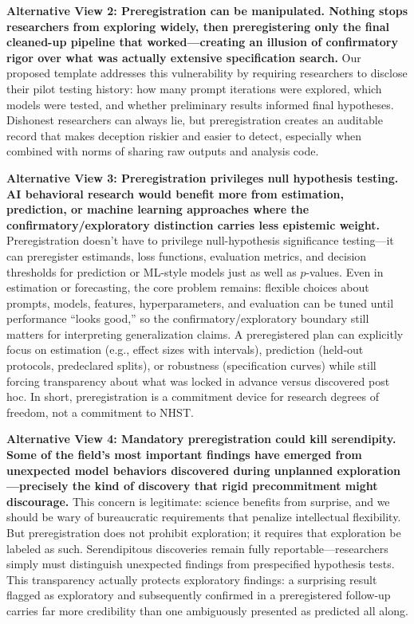 \documentclass{article}
\theoremstyle{plain}
\theoremstyle{definition}
\theoremstyle{remark}
\begin{document}
\textbf{Alternative View 2: Preregistration can be manipulated. Nothing stops researchers from exploring widely, then preregistering only the final cleaned-up pipeline that worked—creating an illusion of confirmatory rigor over what was actually extensive specification search.} Our proposed template addresses this vulnerability by requiring researchers to disclose their pilot testing history: how many prompt iterations were explored, which models were tested, and whether preliminary results informed final hypotheses. Dishonest researchers can always lie, but preregistration creates an auditable record that makes deception riskier and easier to detect, especially when combined with norms of sharing raw outputs and analysis code. 

\textbf{Alternative View 3: Preregistration privileges null hypothesis testing. AI behavioral research would benefit more from estimation, prediction, or machine learning approaches where the confirmatory/exploratory distinction carries less epistemic weight.} Preregistration doesn’t have to privilege null-hypothesis significance testing—it can preregister estimands, loss functions, evaluation metrics, and decision thresholds for prediction or ML-style models just as well as $p$-values. Even in estimation or forecasting, the core problem remains: flexible choices about prompts, models, features, hyperparameters, and evaluation can be tuned until performance “looks good,” so the confirmatory/exploratory boundary still matters for interpreting generalization claims. A preregistered plan can explicitly focus on estimation (e.g., effect sizes with intervals), prediction (held-out protocols, predeclared splits), or robustness (specification curves) while still forcing transparency about what was locked in advance versus discovered post hoc. In short, preregistration is a commitment device for research degrees of freedom, not a commitment to NHST.

\textbf{Alternative View 4: Mandatory preregistration could kill serendipity. Some of the field's most important findings have emerged from unexpected model behaviors discovered during unplanned exploration—precisely the kind of discovery that rigid precommitment might discourage.} This concern is legitimate: science benefits from surprise, and we should be wary of bureaucratic requirements that penalize intellectual flexibility. But preregistration does not prohibit exploration; it requires that exploration be labeled as such. Serendipitous discoveries remain fully reportable—researchers simply must distinguish unexpected findings from prespecified hypothesis tests. This transparency actually protects exploratory findings: a surprising result flagged as exploratory and subsequently confirmed in a preregistered follow-up carries far more credibility than one ambiguously presented as predicted all along.
\end{document}
